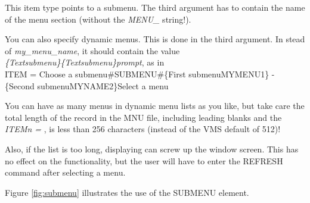 \documentclass[a4paper]{book}
\newcommand{\vs}{\vspace{3mm}}
\renewcommand{\indent}{\hspace*{5mm}}
\begin{document}
This item type points to a submenu. The third argument has to contain the 
name of the menu section (without the \textsl{MENU{\_}} string!).

\vs

You can also specify dynamic menus. This is done in the third argument. In 
stead of \textit{my{\_}menu{\_}name}, it should contain the value \\
\textsl{{\{}\textit{Text}\textbar\textit{submenu}{\}}{\{}\textit{Text}\textbar\textit{submenu}{\}}\textit{prompt}},
as in\\
\indent\textsf{ITEM = Choose a submenu{\#}SUBMENU{\#}{\{}First submenu\textbar MYMENU1{\}} - }\\
\indent\indent\textsf{{\{}Second submenu\textbar MYNAME2{\}}Select a menu}

\vs

You can have as many menus in dynamic menu lists as you like, but take care 
the total length of the record in the MNU file, including leading blanks and 
the \textsl{ITEM\textit{n} = }, is less than 256 characters (instead of the VMS default of 
512)!

Also, if the list is too long, displaying can screw up the window screen. 
This has no effect on the functionality, but the user will have to enter the 
\textsf{REFRESH} command after selecting a menu.

Figure \ref{fig:submenu} illustrates the use of the \textsf{SUBMENU} element.
\end{document}
